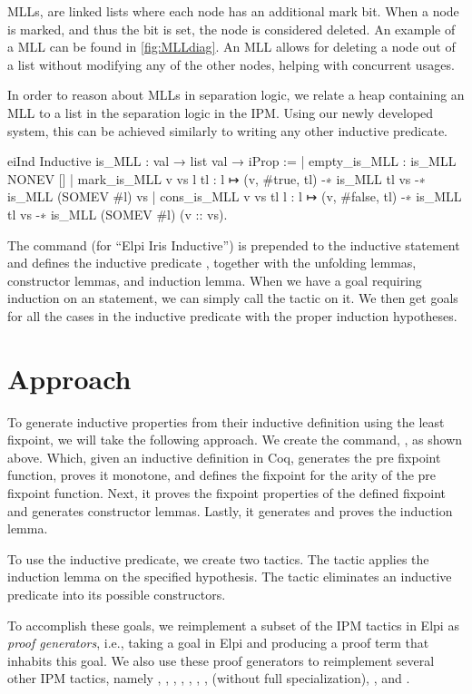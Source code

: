 \documentclass[thesis.tex]{subfiles}
\begin{document}
MLLs, are linked lists where each node has an additional mark bit. When a node is marked, and thus the bit is set, the node is considered deleted. An example of a MLL can be found in \cref{fig:MLLdiag}. An MLL allows for deleting a node out of a list without modifying any of the other nodes, helping with concurrent usages.

In order to reason about MLLs in separation logic, we relate a heap containing an MLL to a list in the separation logic in the IPM. Using our newly developed system, this can be achieved similarly to writing any other inductive predicate.
\begin{coqcode}
  eiInd
  Inductive is_MLL : val → list val → iProp :=
      | empty_is_MLL : is_MLL NONEV []
      | mark_is_MLL v vs l tl : 
        l ↦ (v, #true, tl) -∗ is_MLL tl vs -∗ 
        is_MLL (SOMEV #l) vs
      | cons_is_MLL v vs tl l : 
        l ↦ (v, #false, tl) -∗ is_MLL tl vs -∗ 
        is_MLL (SOMEV #l) (v :: vs).
\end{coqcode}
The command  (for ``Elpi Iris Inductive'') is prepended to the inductive statement and defines the inductive predicate , together with the unfolding lemmas, constructor lemmas, and induction lemma. When we have a goal requiring induction on an  statement, we can simply call the  tactic on it. We then get goals for all the cases in the inductive predicate with the proper induction hypotheses.

\section{Approach}
To generate inductive properties from their inductive definition using the least fixpoint, we will take the following approach. We create the command, , as shown above. Which, given an inductive definition in Coq, generates the pre fixpoint function, proves it monotone, and defines the fixpoint for the arity of the pre fixpoint function. Next, it proves the fixpoint properties of the defined fixpoint and generates constructor lemmas. Lastly, it generates and proves the induction lemma.

To use the inductive predicate, we create two tactics. The  tactic applies the induction lemma on the specified hypothesis. The  tactic eliminates an inductive predicate into its possible constructors.

To accomplish these goals, we reimplement a subset of the IPM tactics in Elpi as \emph{proof generators}, i.e., taking a goal in Elpi and producing a proof term that inhabits this goal. We also use these proof generators to reimplement several other IPM tactics, namely , , , , , , ,  (without full specialization), , and .
\end{document}
